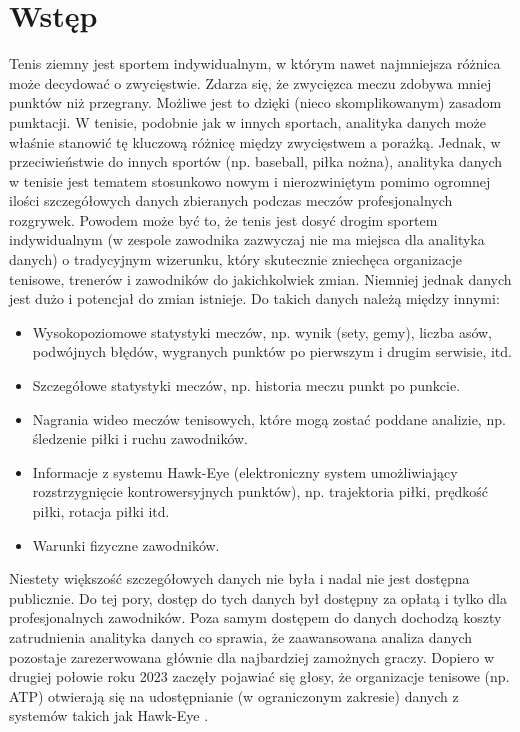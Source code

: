 \documentclass[12pt, a4paper]{article}
\begin{document}
\section{Wstęp}
Tenis ziemny jest sportem indywidualnym, w którym nawet najmniejsza różnica może decydować o zwycięstwie. Zdarza się, że zwycięzca meczu zdobywa mniej punktów niż przegrany. Możliwe jest to dzięki (nieco skomplikowanym) zasadom punktacji. W tenisie, podobnie jak w innych sportach, analityka danych może właśnie stanowić tę kluczową różnicę między zwycięstwem a porażką. Jednak, w przeciwieństwie do innych sportów (np. baseball, piłka nożna), analityka danych w tenisie jest tematem stosunkowo nowym i nierozwiniętym pomimo ogromnej ilości szczegółowych danych zbieranych podczas meczów profesjonalnych rozgrywek. Powodem może być to, że tenis jest dosyć drogim sportem indywidualnym (w zespole zawodnika zazwyczaj nie ma miejsca dla analityka danych) o tradycyjnym wizerunku, który skutecznie zniechęca organizacje tenisowe, trenerów i zawodników do jakichkolwiek zmian. Niemniej jednak danych jest dużo i potencjał do zmian istnieje. Do takich danych należą między innymi:
\begin{itemize}
    \item Wysokopoziomowe statystyki meczów, np. wynik (sety, gemy), liczba asów, podwójnych błędów, wygranych punktów po pierwszym i drugim serwisie, itd.
    \item Szczegółowe statystyki meczów, np. historia meczu punkt po punkcie.
    \item Nagrania wideo meczów tenisowych, które mogą zostać poddane analizie, np. śledzenie piłki i ruchu zawodników.
    \item Informacje z systemu Hawk-Eye (elektroniczny system umożliwiający rozstrzygnięcie kontrowersyjnych punktów), np. trajektoria piłki, prędkość piłki, rotacja piłki itd.
    \item Warunki fizyczne zawodników.
\end{itemize}
Niestety większość szczegółowych danych nie była i nadal nie jest dostępna publicznie. Do tej pory, dostęp do tych danych był dostępny za opłatą i tylko dla profesjonalnych zawodników. Poza samym dostępem do danych dochodzą koszty zatrudnienia analityka danych co sprawia, że zaawansowana analiza danych pozostaje zarezerwowana głównie dla najbardziej zamożnych graczy. Dopiero w drugiej połowie roku 2023 zaczęły pojawiać się głosy, że organizacje tenisowe (np. ATP) otwierają się na udostępnianie (w ograniczonym zakresie) danych z systemów takich jak Hawk-Eye \cite{the_telegraph}.
\end{document}
